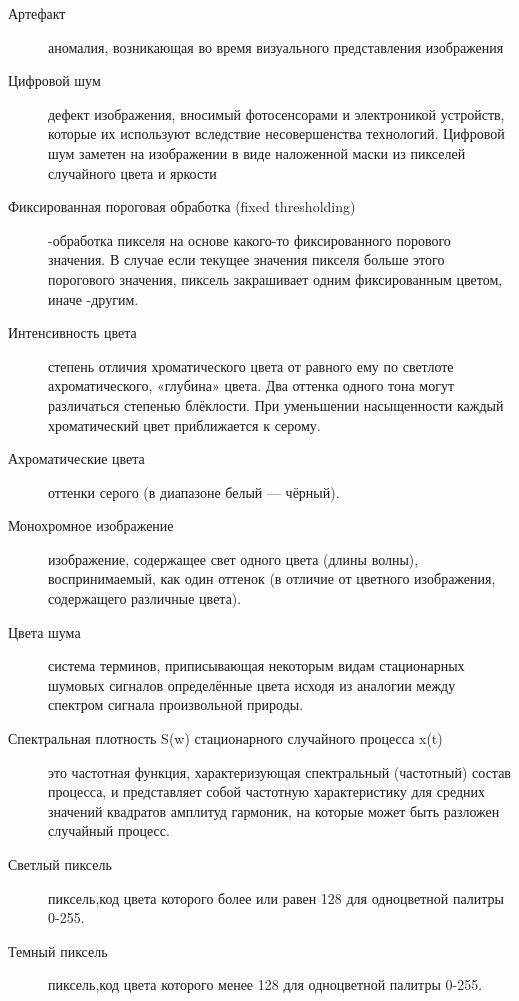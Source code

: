 \Defines %
\begin{description}
	
	\item[Артефакт]
	аномалия, возникающая во время визуального представления изображения\cite{Wiki_artifact}
	\item[Цифровой шум] дефект изображения, вносимый фотосенсорами и электроникой устройств, которые их используют вследствие несовершенства технологий.
	Цифровой шум заметен на изображении в виде наложенной маски из пикселей случайного цвета и яркости\cite{Wiki_noise}
	
	\item[Фиксированная пороговая обработка (fixed thresholding)] -обработка пикселя на основе какого-то фиксированного порового значения. В случае если текущее значения пикселя больше этого порогового значения, пиксель закрашивает одним фиксированным цветом, иначе -другим. 
	\cite{Dh}
	\item[Интенсивность цвета]  степень отличия хроматического цвета от равного ему по светлоте ахроматического, «глубина» цвета. Два оттенка одного тона могут различаться степенью блёклости. При уменьшении насыщенности каждый хроматический цвет приближается к серому.\cite{Wiki_intens}
	\item[Ахроматические цвета] оттенки серого (в диапазоне белый — чёрный).\cite{Wiki_achrom}
	\item[Монохромное изображение] изображение, содержащее свет одного цвета (длины волны), воспринимаемый, как один оттенок (в отличие от цветного изображения, содержащего различные цвета).\cite{Wiki_hrom}
	\item[Цвета шума]система терминов, приписывающая некоторым видам стационарных шумовых сигналов определённые цвета исходя из аналогии между спектром сигнала произвольной природы.\cite{Wiki_color_noise}
	\item[Спектральная плотность S(w) стационарного случайного процесса x(t) ] это частотная функция, характеризующая спектральный (частотный) состав процесса, и представляет собой частотную характеристику для средних значений квадратов амплитуд гармоник, на которые может быть разложен случайный процесс.\cite{Wiki_staz}
	\item[Светлый пиксель] пиксель,код цвета которого более или равен 128 для одноцветной палитры 0-255.
	\item[Темный пиксель] пиксель,код цвета которого менее  128 для одноцветной палитры 0-255.
	
	
	
\end{description}

